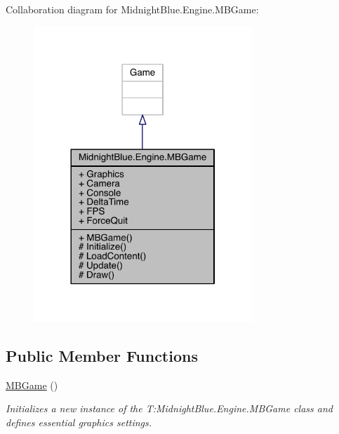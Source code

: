 Collaboration diagram for Midnight\+Blue.\+Engine.\+M\+B\+Game\+:
\nopagebreak
\begin{figure}[H]
\begin{center}
\leavevmode
\includegraphics[width=233pt]{class_midnight_blue_1_1_engine_1_1_m_b_game__coll__graph}
\end{center}
\end{figure}
\subsection*{Public Member Functions}
\begin{DoxyCompactItemize}
\item 
\hyperlink{class_midnight_blue_1_1_engine_1_1_m_b_game_ab2e659408b8dc4793c370c436e3f5f0f}{M\+B\+Game} ()
\begin{DoxyCompactList}\small\item\em Initializes a new instance of the T\+:\+Midnight\+Blue.\+Engine.\+M\+B\+Game class and defines essential graphics settings. \end{DoxyCompactList}\end{DoxyCompactItemize}
